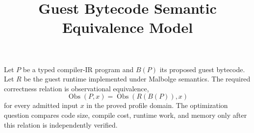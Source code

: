 \documentclass{article}
\title{Guest Bytecode Semantic Equivalence Model}
\begin{document}
\maketitle
Let $P$ be a typed compiler-IR program and $B(P)$ its proposed guest bytecode.
Let $R$ be the guest runtime implemented under Malbolge semantics. The required
correctness relation is observational equivalence,
\[
  \operatorname{Obs}(P,x)=\operatorname{Obs}(R(B(P)),x)
\]
for every admitted input $x$ in the proved profile domain. The optimization
question compares code size, compile cost, runtime work, and memory only after
this relation is independently verified.
\end{document}
